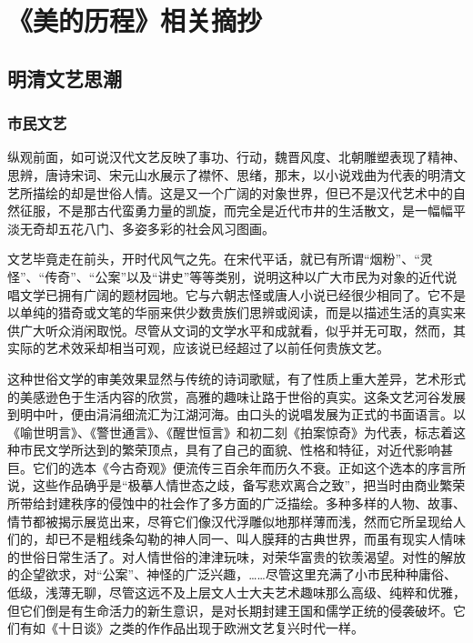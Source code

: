 \section{《美的历程》相关摘抄}
\subsection{明清文艺思潮}
\subsubsection{市民文艺}
纵观前面，如可说汉代文艺反映了事功、行动，魏晋风度、北朝雕塑表现了精神、思辨，唐诗宋词、宋元山水展示了襟怀、思绪，那末，以小说戏曲为代表的明清文艺所描绘的却是世俗人情。这是又一个广阔的对象世界，但已不是汉代艺术中的自然征服，不是那古代蛮勇力量的凯旋，而完全是近代市井的生活散文，是一幅幅平淡无奇却五花八门、多姿多彩的社会风习图画。

文艺毕竟走在前头，开时代风气之先。在宋代平话，就已有所谓“烟粉”、“灵怪”、“传奇”、“公案”以及“讲史”等等类别，说明这种以广大市民为对象的近代说唱文学已拥有广阔的题材园地。它与六朝志怪或唐人小说已经很少相同了。它不是以单纯的猎奇或文笔的华丽来供少数贵族们思辨或阅读，而是以描述生活的真实来供广大听众消闲取悦。尽管从文词的文学水平和成就看，似乎并无可取，然而，其实际的艺术效采却相当可观，应该说已经超过了以前任何贵族文艺。

这种世俗文学的审美效果显然与传统的诗词歌赋，有了性质上重大差异，艺术形式的美感逊色于生活内容的欣赏，高雅的趣味让路于世俗的真实。这条文艺河谷发展到明中叶，便由涓涓细流汇为江湖河海。由口头的说唱发展为正式的书面语言。以《喻世明言》、《警世通言》、《醒世恒言》和初二刻《拍案惊奇》为代表，标志着这种市民文学所达到的繁荣顶点，具有了自己的面貌、性格和特征，对近代影响甚巨。它们的选本《今古奇观》便流传三百余年而历久不衰。正如这个选本的序言所说，这些作品确乎是“极摹人情世态之歧，备写悲欢离合之致”，把当时由商业繁荣所带给封建秩序的侵蚀中的社会作了多方面的广泛描绘。多种多样的人物、故事、情节都被揭示展览出来，尽筲它们像汉代浮雕似地那样薄而浅，然而它所呈现给人们的，却已不是粗线条勾勒的神人同一、叫人膜拜的古典世界，而虽有现实人情味的世俗日常生活了。对人情世俗的津津玩味，对荣华富贵的钦羡渴望。对性的解放的企望欲求，对“公案”、神怪的广泛兴趣，……尽管这里充满了小市民种种庸俗、低级，浅薄无聊，尽管这远不及上层文人士大夫艺术趣味那么高级、纯粹和优雅，但它们倒是有生命活力的新生意识，是对长期封建王国和儒学正统的侵袭破坏。它们有如《十日谈》之类的作作品出现于欧洲文艺复兴时代一样。

